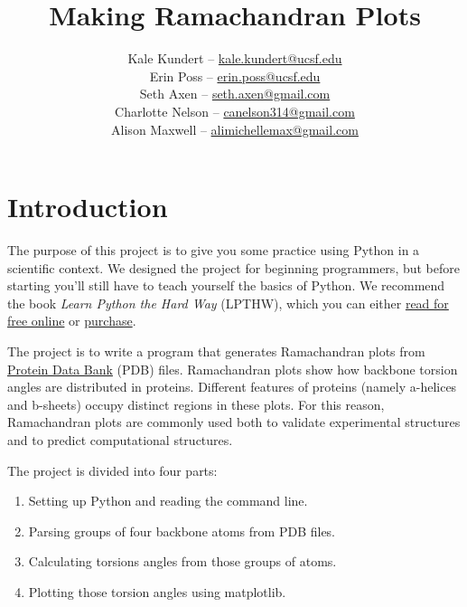 \documentclass{article}
\newcommand{\ahelices}{\textgreek{a}-helices}
\newcommand{\bsheets}{\textgreek{b}-sheets}
\begin{document}
\title{Making Ramachandran Plots}
\author{
 Kale Kundert -- \href{mailto:kale.kundert@ucsf.edu}{kale.kundert@ucsf.edu} \\
 Erin Poss -- \href{mailto:erin.poss@ucsf.edu}{erin.poss@ucsf.edu} \\
 Seth Axen -- \href{mailto:seth.axen@gmail.com}{seth.axen@gmail.com} \\
 Charlotte Nelson -- \href{mailto:canelson314@gmail.com}{canelson314@gmail.com} \\
 Alison Maxwell -- \href{mailto:alimichellemax@gmail.com}{alimichellemax@gmail.com} \\
}
\date{}
\maketitle{}

\section{Introduction}

The purpose of this project is to give you some practice using Python in a 
scientific context.  We designed the project for beginning programmers, but 
before starting you'll still have to teach yourself the basics of Python.  We 
recommend the book \emph{Learn Python the Hard Way} (LPTHW), which you can 
either \href{http://learnpythonthehardway.org/book/}{read for free online} or 
\href{https://paydiv.io/access/buy/2/}{purchase}.

The project is to write a program that generates Ramachandran plots from 
\href{http://www.rcsb.org/pdb/home/home.do}{Protein Data Bank} (PDB) files.  
Ramachandran plots show how backbone torsion angles are distributed in 
proteins.  Different features of proteins (namely \ahelices{} and \bsheets{}) 
occupy distinct regions in these plots.  For this reason, Ramachandran plots 
are commonly used both to validate experimental structures and to predict 
computational structures.

The project is divided into four parts:

\begin{enumerate}
 \item Setting up Python and reading the command line.
 \item Parsing groups of four backbone atoms from PDB files.
 \item Calculating torsions angles from those groups of atoms.
 \item Plotting those torsion angles using matplotlib.
\end{enumerate}
\end{document}
